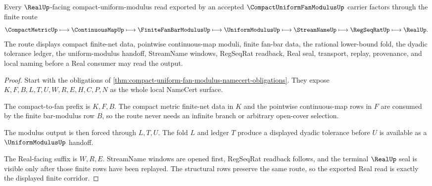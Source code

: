 \begin{theorem}
\label{thm:compact-uniform-fan-modulus-real-route}
Every $\RealUp$-facing compact-uniform-modulus read exported by an accepted $\CompactUniformFanModulusUp$ carrier factors through the finite route
$$
\CompactMetricUp\longmapsto\ContinuousMapUp\longmapsto\FiniteFanBarModulusUp\longmapsto\UniformModulusUp\longmapsto\StreamNameUp\longmapsto\RegSeqRatUp\longmapsto\RealUp .
$$
The route displays compact finite-net data, pointwise continuous-map moduli, finite fan-bar data, the rational lower-bound fold, the dyadic tolerance ledger, the uniform-modulus handoff, StreamName windows, RegSeqRat readback, Real seal, transport, replay, provenance, and local naming before a Real consumer may read the output.
\end{theorem}
\begin{proof}
Start with the obligations of \autoref{thm:compact-uniform-fan-modulus-namecert-obligations}. They expose $K,F,B,L,T,U,W,R,E,H,C,P,N$ as the whole local NameCert surface.

The compact-to-fan prefix is $K,F,B$. The compact metric finite-net data in $K$ and the pointwise continuous-map rows in $F$ are consumed by the finite bar-modulus row $B$, so the route never needs an infinite branch or arbitrary open-cover selection.

The modulus output is then forced through $L,T,U$. The fold $L$ and ledger $T$ produce a displayed dyadic tolerance before $U$ is available as a $\UniformModulusUp$ handoff.

The Real-facing suffix is $W,R,E$. StreamName windows are opened first, RegSeqRat readback follows, and the terminal $\RealUp$ seal is visible only after those finite rows have been replayed. The structural rows preserve the same route, so the exported Real read is exactly the displayed finite corridor.
\end{proof}

